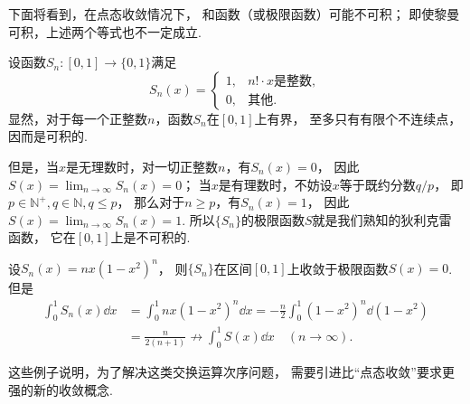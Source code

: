 下面将看到，在点态收敛情况下，
和函数（或极限函数）可能不可积；
即使黎曼可积，上述两个等式也不一定成立.
\begin{example}
设函数\(S_n\colon[0,1]\to\{0,1\}\)满足\begin{equation*}
	S_n(x) = \left\{ \begin{array}{cl}
		1, & \text{$n! \cdot x$是整数},  \\
		0, & \text{其他}.
	\end{array} \right.
\end{equation*}
显然，对于每一个正整数\(n\)，函数\(S_n\)在\([0,1]\)上有界，
至多只有有限个不连续点，因而是可积的.

但是，当\(x\)是无理数时，对一切正整数\(n\)，有\(S_n(x) = 0\)，
因此\(S(x) = \lim_{n\to\infty} S_n(x) = 0\)；
当\(x\)是有理数时，不妨设\(x\)等于既约分数\(q/p\)，
即\(p\in\mathbb{N}^+,
q\in\mathbb{N},
q \leq p\)，
那么对于\(n \geq p\)，有\(S_n(x) = 1\)，
因此\(S(x) = \lim_{n\to\infty} S_n(x) = 1\).
所以\(\{S_n\}\)的极限函数\(S\)就是我们熟知的狄利克雷函数，
它在\([0,1]\)上是不可积的.
\end{example}
\begin{example}
设\(S_n(x) = nx(1-x^2)^n\)，
则\(\{S_n\}\)在区间\([0,1]\)上收敛于极限函数\(S(x) = 0\).
但是\begin{align*}
	\int_0^1 S_n(x) \dd{x}
	&= \int_0^1 n x (1-x^2)^n \dd{x}
	= -\frac{n}{2} \int_0^1 (1-x^2)^n \dd(1-x^2) \\
	&= \frac{n}{2(n+1)}
	\not\to \int_0^1 S(x) \dd{x}
	\quad(n\to\infty).
\end{align*}
\end{example}
这些例子说明，为了解决这类交换运算次序问题，
需要引进比“点态收敛”要求更强的新的收敛概念.

